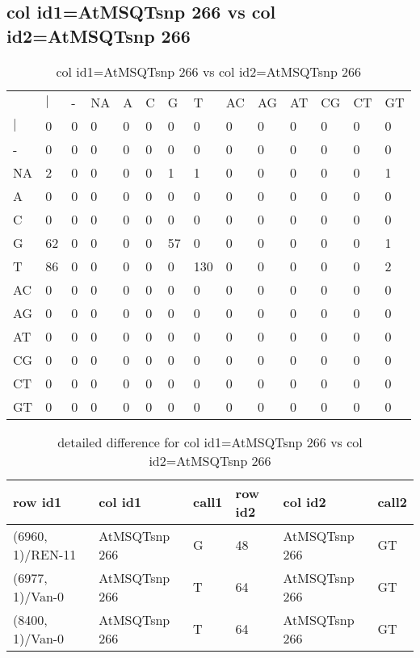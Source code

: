 \subsection{col id1=AtMSQTsnp 266 vs col id2=AtMSQTsnp 266}
\begin{center}
\begin{longtable}{|l|l|l|l|l|l|l|l|l|l|l|l|l|l|}
\caption{col id1=AtMSQTsnp 266 vs col id2=AtMSQTsnp 266} \label{table_dm810}\\
\hline
\\
\hline
&$|$&-&NA&A&C&G&T&AC&AG&AT&CG&CT&GT\\
$|$&0&0&0&0&0&0&0&0&0&0&0&0&0\\
-&0&0&0&0&0&0&0&0&0&0&0&0&0\\
NA&2&0&0&0&0&1&1&0&0&0&0&0&1\\
A&0&0&0&0&0&0&0&0&0&0&0&0&0\\
C&0&0&0&0&0&0&0&0&0&0&0&0&0\\
G&62&0&0&0&0&57&0&0&0&0&0&0&1\\
T&86&0&0&0&0&0&130&0&0&0&0&0&2\\
AC&0&0&0&0&0&0&0&0&0&0&0&0&0\\
AG&0&0&0&0&0&0&0&0&0&0&0&0&0\\
AT&0&0&0&0&0&0&0&0&0&0&0&0&0\\
CG&0&0&0&0&0&0&0&0&0&0&0&0&0\\
CT&0&0&0&0&0&0&0&0&0&0&0&0&0\\
GT&0&0&0&0&0&0&0&0&0&0&0&0&0\\
\hline
\end{longtable}
\end{center}

\begin{center}
\begin{longtable}{|l|l|l|l|l|l|}
\caption{detailed difference for col id1=AtMSQTsnp 266 vs col id2=AtMSQTsnp 266} \label{table_dm811}\\
\hline
row id1&col id1&call1&row id2&col id2&call2\\
\hline
(6960, 1)/REN-11&AtMSQTsnp 266&G&48&AtMSQTsnp 266&GT\\
(6977, 1)/Van-0&AtMSQTsnp 266&T&64&AtMSQTsnp 266&GT\\
(8400, 1)/Van-0&AtMSQTsnp 266&T&64&AtMSQTsnp 266&GT\\
\hline
\end{longtable}
\end{center}


